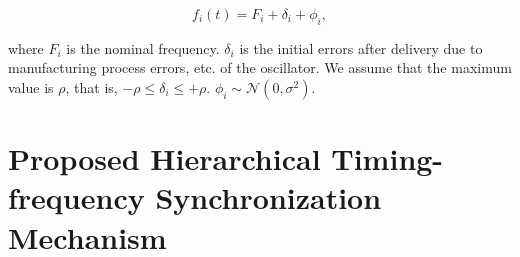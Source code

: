 \documentclass[conference]{IEEEtran}
\begin{document}


\begin{equation}
f_i(t)=F_i+\delta_i+\phi_i, \label {eq2}
\end{equation}

\noindent where $F_i$ is the nominal frequency. $\delta_i$ is the initial errors after delivery due to manufacturing process errors, etc. of the oscillator. We assume that the maximum value is $\rho$, that is, $- \rho \le \delta_i \le + \rho$. $\phi_i \sim \mathcal N(0,\sigma^2)$.


\section{Proposed Hierarchical Timing-frequency Synchronization Mechanism}
\end{document}
